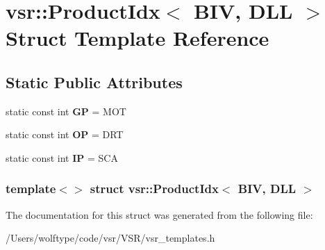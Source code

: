 \hypertarget{structvsr_1_1_product_idx_3_01_b_i_v_00_01_d_l_l_01_4}{\section{vsr\-:\-:Product\-Idx$<$ B\-I\-V, D\-L\-L $>$ Struct Template Reference}
\label{structvsr_1_1_product_idx_3_01_b_i_v_00_01_d_l_l_01_4}
}
\subsection*{Static Public Attributes}
\begin{DoxyCompactItemize}
\item 
\hypertarget{structvsr_1_1_product_idx_3_01_b_i_v_00_01_d_l_l_01_4_a4690986109b4ea56afc8db2164537908}{static const int {\bfseries G\-P} = M\-O\-T}\label{structvsr_1_1_product_idx_3_01_b_i_v_00_01_d_l_l_01_4_a4690986109b4ea56afc8db2164537908}

\item 
\hypertarget{structvsr_1_1_product_idx_3_01_b_i_v_00_01_d_l_l_01_4_a8f21aeb0cf4afe168ec7972345e0060f}{static const int {\bfseries O\-P} = D\-R\-T}\label{structvsr_1_1_product_idx_3_01_b_i_v_00_01_d_l_l_01_4_a8f21aeb0cf4afe168ec7972345e0060f}

\item 
\hypertarget{structvsr_1_1_product_idx_3_01_b_i_v_00_01_d_l_l_01_4_a95655e0b568a4c120d439c4624251ed7}{static const int {\bfseries I\-P} = S\-C\-A}\label{structvsr_1_1_product_idx_3_01_b_i_v_00_01_d_l_l_01_4_a95655e0b568a4c120d439c4624251ed7}

\end{DoxyCompactItemize}
\subsubsection*{template$<$$>$ struct vsr\-::\-Product\-Idx$<$ B\-I\-V, D\-L\-L $>$}



The documentation for this struct was generated from the following file\-:\begin{DoxyCompactItemize}
\item 
/\-Users/wolftype/code/vsr/\-V\-S\-R/vsr\-\_\-templates.\-h\end{DoxyCompactItemize}
